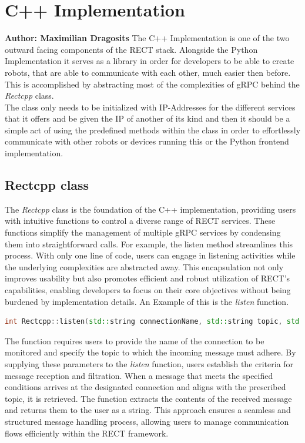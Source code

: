 \section{C++ Implementation}
\textbf{Author: Maximilian Dragosits}
The C++ Implementation is one of the two outward facing components of the RECT stack. Alongside the Python Implementation 
it serves as a library in order for developers to be able to create robots, that are able to communicate with each other, much
easier then before. This is accomplished by abstracting most of the complexities of gRPC behind the \textit{Rectcpp} class. \\

The class only needs to be initialized with IP-Addresses for the different services that it offers and be given the IP of 
another of its kind and then it should be a simple act of using the predefined methods within the class in order to 
effortlessly communicate with other robots or devices running this or the Python frontend implementation.

\subsection{Rectcpp class}
The \textit{Rectcpp} class is the foundation of the C++ implementation, providing users with intuitive functions to control a diverse range of RECT services. 
These functions simplify the management of multiple gRPC services by condensing them into straightforward calls. 
For example, the listen method streamlines this process. With only one line of code, users can engage in listening activities while the underlying complexities are abstracted away. This encapsulation 
not only improves usability but also promotes efficient and robust utilization of RECT's capabilities, enabling developers to focus on their core objectives 
without being burdened by implementation details. An Example of this is the \textit{listen} function.

\begin{minipage}{\textwidth}
\begin{lstlisting}[language=c++]
  int Rectcpp::listen(std::string connectionName, std::string topic, std::string& returning);
\end{lstlisting}
\end{minipage}

The function requires users to provide the name of the connection to be monitored and specify the topic to which the incoming message must adhere. By supplying 
these parameters to the \textit{listen} function, users establish the criteria for message reception and filtration. When a message that meets the specified conditions 
arrives at the designated connection and aligns with the prescribed topic, it is retrieved. The function extracts the contents of the received message and 
returns them to the user as a string. This approach ensures a seamless and structured message handling process, allowing users to manage communication flows 
efficiently within the RECT framework.

